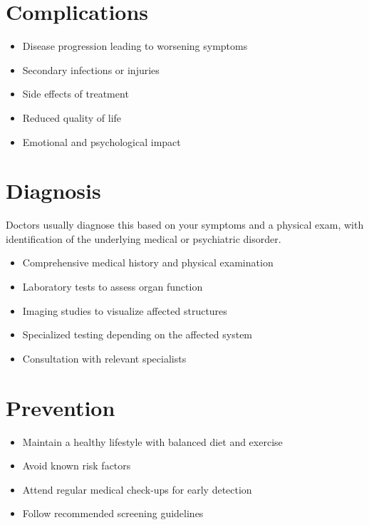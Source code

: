 \section{Complications}
\begin{itemize}[noitemsep]
  \item Disease progression leading to worsening symptoms
  \item Secondary infections or injuries
  \item Side effects of treatment
  \item Reduced quality of life
  \item Emotional and psychological impact
\end{itemize}
\section{Diagnosis}
Doctors usually diagnose this based on your symptoms and a physical exam, with identification of the underlying medical or psychiatric disorder.

\begin{itemize}[noitemsep]
  \item Comprehensive medical history and physical examination
  \item Laboratory tests to assess organ function
  \item Imaging studies to visualize affected structures
  \item Specialized testing depending on the affected system
  \item Consultation with relevant specialists
\end{itemize}
\section{Prevention}
\begin{itemize}[noitemsep]
  \item Maintain a healthy lifestyle with balanced diet and exercise
  \item Avoid known risk factors
  \item Attend regular medical check-ups for early detection
  \item Follow recommended screening guidelines
\end{itemize}
